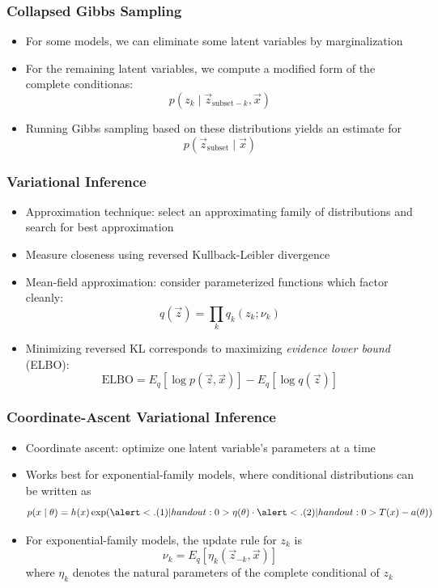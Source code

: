 \begin{frame}
\frametitle{Collapsed Gibbs Sampling}
\begin{itemize}[<+->]
\item For some models, we can eliminate some latent variables by marginalization
\item For the remaining latent variables, we compute a modified form of the complete conditionas:
\[ p(z_k \mid \vec z_{\text{subset}-k}, \vec x) \]
\item Running Gibbs sampling based on these distributions yields an estimate for
\[ p(\vec z_{\text{subset}} \mid \vec x) \]
\end{itemize}
\end{frame}

\begin{frame}
\frametitle{Variational Inference}
\begin{itemize}[<+->]
\item Approximation technique: select an approximating family of distributions and search for best approximation
\item Measure closeness using reversed Kullback-Leibler divergence
\item Mean-field approximation: consider parameterized functions which factor cleanly:
\[ q(\vec z) = \prod_k q_k(z_k; \nu_k) \]
\item Minimizing reversed KL corresponds to maximizing \emph{evidence lower bound} (ELBO):
\[ \text{ELBO} = E_q[\log p(\vec z, \vec x)] - E_q[\log q(\vec z)] \]
\end{itemize}
\end{frame}

\begin{frame}
\frametitle{Coordinate-Ascent Variational Inference}
\begin{itemize}[<+->]
\item Coordinate ascent: optimize one latent variable's parameters at a time
\item Works best for exponential-family models, where conditional distributions can be written as
\[ p(x \mid \theta) = h(x) \exp( \alert<.(1)| handout:0>{\eta(\theta)} \cdot \alert<.(2)| handout:0>{T(x)} - a(\theta)) \]
 \pause
\item For exponential-family models, the update rule for $z_k$ is
\[ \nu_k = E_q[\eta_k(\vec z_{-k}, \vec x)] \]
where $\eta_k$ denotes the natural parameters of the complete conditional of $z_k$
\end{itemize}
\end{frame}

